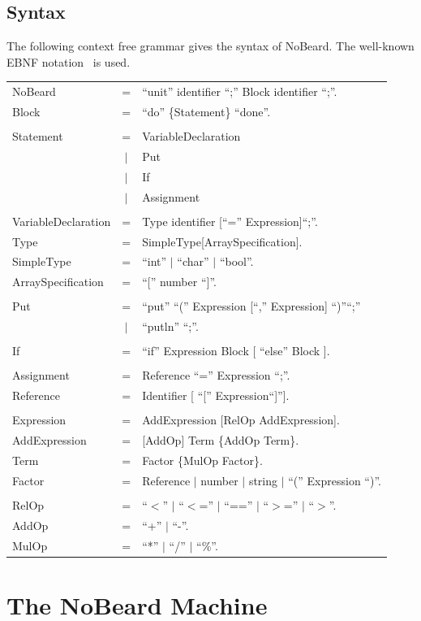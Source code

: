 \documentclass[11pt]{report}
\newcommand{\leongage}{NoBeard}
\newenvironment{grammar}
	{
		\newcommand{\completerule}[2]{##1 & = & ##2.\\}
		\newcommand{\startrule}[2]{##1 & = & ##2\\}
		\newcommand{\alternativerule}[1]{ & $|$ & ##1\\}
		\newcommand{\alternativeend}[1]{ & $|$ & ##1.\\}
		\newcommand{\finishrule}[1]{ & & ##1.\\}
		\begin{tabular}{p{.25\textwidth} c p{.75\textwidth}}
	}
	{	\end{tabular}
	}
\begin{document}
\section{Syntax}
The following context free grammar gives the syntax of \leongage{}. The well-known EBNF notation~\cite{wirth_what_1977} is used.

	\begin{grammar}
		\completerule{NoBeard}{``unit'' identifier ``;'' Block identifier ``;''}

		\completerule{Block}{``do'' \{Statement\} ``done''}

		\\

		\startrule{Statement}{VariableDeclaration}
		\alternativerule{Put}
		\alternativerule{If}
		\alternativerule{Assignment}
		\\
		\completerule{VariableDeclaration}{Type identifier [``='' Expression]``;''}
		\completerule{Type}{SimpleType[ArraySpecification]}
		\completerule{SimpleType}{``int'' $|$ ``char'' $|$ ``bool''}
		\completerule{ArraySpecification}{``['' number ``]''}
		\\
		\startrule{Put}{``put'' ``('' Expression [``,'' Expression] ``)''``;''}
		\alternativeend{``putln'' ``;''}
		\\
		\completerule{If}{``if'' Expression Block [ ``else'' Block ]}
		\\
		\completerule{Assignment}{Reference ``='' Expression ``;''}
		\completerule{Reference}{Identifier [ ``['' Expression``]'']}
		\\
		\completerule{Expression}{AddExpression [RelOp AddExpression]}
		\completerule{AddExpression}{[AddOp] Term \{AddOp Term\}}
		\completerule{Term}{Factor \{MulOp Factor\}}
		\completerule{Factor}{Reference $|$ number $|$ string $|$ ``('' Expression ``)''}
		\\
		\completerule{RelOp}{``$<$'' $|$ ``$<$='' $|$ ``=='' $|$ ``$>$='' $|$ ``$>$''}
		\completerule{AddOp}{``+'' $|$ ``-''}
		\completerule{MulOp}{``*'' $|$ ``/'' $|$ ``\%''}	
	\end{grammar}

\chapter{The \leongage{} Machine}
\lstset{language=AsmDef}
\end{document}
